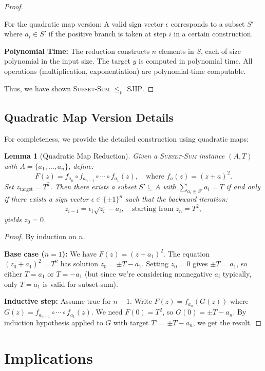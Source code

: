 \documentclass[11pt]{article}
\newtheorem{lemma}[theorem]{Lemma}
\begin{document}
\begin{proof}
\begin{itemize}
    For the quadratic map version: A valid sign vector $\epsilon$ corresponds to a subset $S'$ where $a_i \in S'$ if the positive branch is taken at step $i$ in a certain construction.
\end{itemize}

\noindent\textbf{Polynomial Time:}
The reduction constructs $n$ elements in $S$, each of size polynomial in the input size. The target $y$ is computed in polynomial time. All operations (multiplication, exponentiation) are polynomial-time computable.

Thus, we have shown \textsc{Subset-Sum} $\leq_p$ \textsc{SJIP}.
\end{proof}

\subsection{Quadratic Map Version Details}
For completeness, we provide the detailed construction using quadratic maps:

\begin{lemma}[Quadratic Map Reduction]
\label{lem:quadratic-reduction}
Given a \textsc{Subset-Sum} instance $(A, T)$ with $A = \{a_1, \dots, a_n\}$, define:
\[
F(z) = f_{a_n} \circ f_{a_{n-1}} \circ \cdots \circ f_{a_1}(z), \quad \text{where } f_a(z) = (z + a)^2.
\]
Set $z_{\text{target}} = T^2$. Then there exists a subset $S' \subseteq A$ with $\sum_{a_i \in S'} a_i = T$ if and only if there exists a sign vector $\epsilon \in \{\pm 1\}^n$ such that the backward iteration:
\[
z_{i-1} = \epsilon_i \sqrt{z_i} - a_i, \quad \text{starting from } z_n = T^2,
\]
yields $z_0 = 0$.
\end{lemma}

\begin{proof}
By induction on $n$.

\textbf{Base case ($n=1$):} We have $F(z) = (z + a_1)^2$. The equation $(z_0 + a_1)^2 = T^2$ has solution $z_0 = \pm T - a_1$. Setting $z_0 = 0$ gives $\pm T = a_1$, so either $T = a_1$ or $T = -a_1$ (but since we're considering nonnegative $a_i$ typically, only $T = a_1$ is valid for subset-sum).

\textbf{Inductive step:} Assume true for $n-1$. Write $F(z) = f_{a_n}(G(z))$ where $G(z) = f_{a_{n-1}} \circ \cdots \circ f_{a_1}(z)$. We need $F(0) = T^2$, so $G(0) = \pm T - a_n$. By induction hypothesis applied to $G$ with target $T' = \pm T - a_n$, we get the result.
\end{proof}

\section{Implications}
\end{document}
